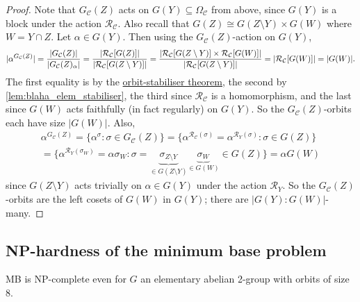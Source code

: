 \begin{proof}
    Note that $G_\mathcal{C}(Z)$ acts on $G(Y) \subseteq \Omega_\mathcal{C}$ from above, since $G(Y)$ is a block under the action $\mathcal{R}_\mathcal{C}$. Also recall that $G(Z) \cong G(Z \setminus Y) \times G(W)$ where $W = Y \cap Z$. Let $\alpha \in G(Y)$. Then using the $G_\mathcal{C}(Z)$-action on $G(Y)$,
    $$|\alpha^{G_\mathcal{C}(Z)}| = \frac{|G_\mathcal{C}(Z)|}{|\added{2}{G_\mathcal{C}(Z)_\alpha}|} = \frac{|\mathcal{R}_\mathcal{C}[G(Z)]|}{|\mathcal{R}_\mathcal{C}[G(Z \setminus Y)]|} = \frac{|\mathcal{R}_\mathcal{C}[G(Z \setminus Y)] \times \mathcal{R}_\mathcal{C}[G(W)]|}{|\mathcal{R}_\mathcal{C}[G(Z \setminus Y)]|} = |\mathcal{R}_\mathcal{C}[G(W)]| = |G(W)|.$$
    The first equality is by the \hyperref[thm:orbit_stabiliser]{orbit-stabiliser theorem}, the second by \autoref{lem:blaha_elem_stabiliser}, the third since $\mathcal{R}_\mathcal{C}$ is a homomorphism, and the last since $G(W)$ acts faithfully (in fact regularly) on $G(Y)$. So the $G_\mathcal{C}(Z)$-orbits each have size $|G(W)|$. Also,
    \begin{multline*}
        \alpha^{G_\mathcal{C}(Z)} = \{\alpha^\sigma : \sigma \in G_\mathcal{C}(Z)\} = \{\alpha^{\mathcal{R}_\mathcal{C}(\sigma)} = \alpha^{\mathcal{R}_Y(\sigma)} : \sigma \in G(Z)\} \\
        = \{\alpha^{\mathcal{R}_Y(\sigma_W)} = \alpha\sigma_W : \sigma = \underbrace{\sigma_{Z \setminus Y}}_{\in G(Z \setminus Y)}\underbrace{\sigma_W}_{\in G(W)} \in G(Z)\} = \alpha G(W)
    \end{multline*}
    since $G(Z \setminus Y)$ acts trivially  on $\alpha \in G(Y)$ under the action $\mathcal{R}_Y$. So the $G_\mathcal{C}(Z)$-orbits are the left cosets of $G(W)$ in $G(Y)$; there are $|G(Y) : G(W)|$-many.
\end{proof}

\subsection{NP-hardness of the minimum base problem}

\begin{theorem}\label{thm:blaha_elem_NP_complete}
    MB is NP-complete even for $G$ an elementary abelian 2-group with orbits of size 8.
\end{theorem}

